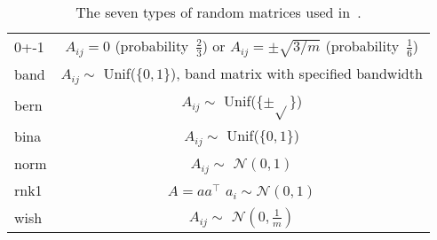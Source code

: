 \documentclass[11pt,a4paper]{article}
\theoremstyle{definition}
\begin{document}
\begin{table}
  \begin{center}
    \begin{tabular}[h]{l c}
      0+-1 & $A_{ij} = 0$ (probability~$\tfrac{2}{3}$) or
             $A_{ij} = \pm \sqrt{3/m}$ (probability~$\tfrac{1}{6}$) \\
      band & $A_{ij}\sim$ Unif($\{0,1\}$), band matrix with specified bandwidth \\
      bern & $A_{ij}\sim$ Unif($\{\pm \sqrt{}\}$) \\
      bina & $A_{ij}\sim$ Unif($\{0,1\}$) \\
      norm & $A_{ij}\sim$ $\mathcal{N}(0,1)$ \\
      rnk1 & $A = aa^\top$ $a_i \sim
             \mathcal{N}(0,1)$ \\
      wish & $A_{ij}\sim$ $\mathcal{N}(0,\tfrac{1}{m})$
    \end{tabular}
  \end{center}
  \caption{The seven types of random matrices used in~\cite{GalP16}.}
  \label{tab:MatrixTypesRIP}
\end{table}
\end{document}
